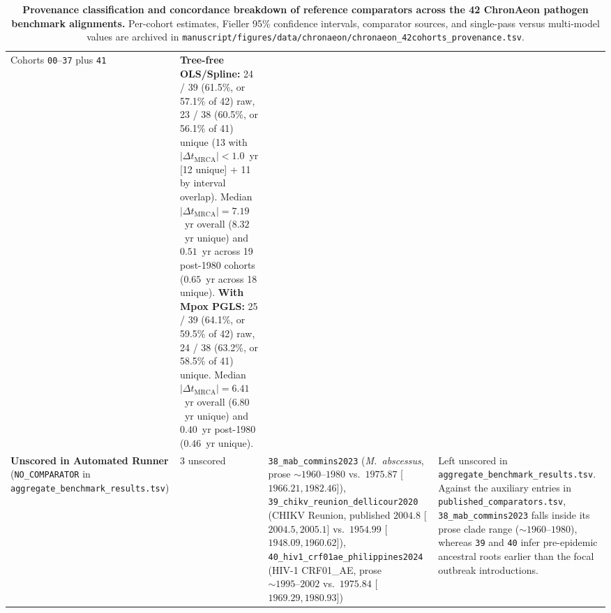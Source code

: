 \documentclass[11pt,letterpaper]{article}
\begin{document}
\begin{table}[!htbp]
\begin{tabularx}{\textwidth}{p{3.1cm}p{1.7cm}p{4.2cm}X}
Cohorts \texttt{00}--\texttt{37} plus \texttt{41} &
\textbf{Tree-free OLS/Spline:} 24 / 39 (61.5\%, or 57.1\% of 42) raw, 23 / 38 (60.5\%, or 56.1\% of 41) unique (13 with $|\Delta t_{\mathrm{MRCA}}| < 1.0$~yr [12 unique] + 11 by interval overlap). Median $|\Delta t_{\mathrm{MRCA}}| = 7.19$~yr overall ($8.32$~yr unique) and $0.51$~yr across 19 post-1980 cohorts ($0.65$~yr across 18 unique). \newline
\textbf{With Mpox PGLS:} 25 / 39 (64.1\%, or 59.5\% of 42) raw, 24 / 38 (63.2\%, or 58.5\% of 41) unique. Median $|\Delta t_{\mathrm{MRCA}}| = 6.41$~yr overall ($6.80$~yr unique) and $0.40$~yr post-1980 ($0.46$~yr unique). \\
\addlinespace
\textbf{Unscored in Automated Runner} \newline (\texttt{NO\_COMPARATOR} in \nolinkurl{aggregate_benchmark_results.tsv}) & 3 unscored &
\nolinkurl{38_mab_commins2023} (\textit{M.\ abscessus}, prose $\sim 1960\text{--}1980$ vs.\ $1975.87$ [$1966.21, 1982.46$]), \newline
\nolinkurl{39_chikv_reunion_dellicour2020} (CHIKV Reunion, published $2004.8$ [$2004.5, 2005.1$] vs.\ $1954.99$ [$1948.09, 1960.62$]), \newline
\nolinkurl{40_hiv1_crf01ae_philippines2024} (HIV-1 CRF01\_AE, prose $\sim 1995\text{--}2002$ vs.\ $1975.84$ [$1969.29, 1980.93$]) &
Left unscored in \nolinkurl{aggregate_benchmark_results.tsv}. Against the auxiliary entries in \nolinkurl{published_comparators.tsv}, \nolinkurl{38_mab_commins2023} falls inside its prose clade range ($\sim 1960\text{--}1980$), whereas \texttt{39} and \texttt{40} infer pre-epidemic ancestral roots earlier than the focal outbreak introductions. \\
\bottomrule
\end{tabularx}
\caption{\textbf{Provenance classification and concordance breakdown of reference comparators across the 42 ChronAeon pathogen benchmark alignments.} Per-cohort estimates, Fieller 95\% confidence intervals, comparator sources, and single-pass versus multi-model values are archived in \nolinkurl{manuscript/figures/data/chronaeon/chronaeon_42cohorts_provenance.tsv}.}
\label{tab:chronaeon_comparators}
\end{table}
\end{document}

